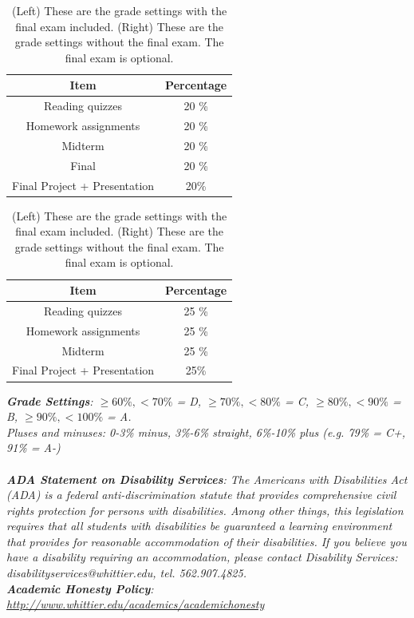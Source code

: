\documentclass[10pt]{article}
\begin{document}
\begin{table}[h]
\centering
\begin{tabular}{| c | c |}
\hline
Item & Percentage \\ \hline \hline
Reading quizzes & 20 \% \\ \hline
Homework assignments & 20 \% \\ \hline
Midterm & 20 \% \\ \hline
Final & 20 \% \\ \hline
Final Project + Presentation & 20\% \\ \hline
\end{tabular}
\begin{tabular}{| c | c |}
\hline
Item & Percentage \\ \hline \hline
Reading quizzes & 25 \% \\ \hline
Homework assignments & 25 \% \\ \hline
Midterm & 25 \% \\ \hline
Final Project + Presentation & 25\% \\ \hline
\end{tabular}
\caption{\label{tab:grades} (Left) These are the grade settings with the final exam included. (Right) These are the grade settings without the final exam.  The final exam is optional.}
\end{table}
\vspace{0.5cm}
\textit{\textbf{Grade Settings}: $\geq 60\%, <70\%$ = D, $\geq 70\%, <80\%$ = C, $\geq 80\%, <90\%$ = B, $\geq 90\%, <100\%$ = A.  \\ Pluses and minuses: 0-3\% minus, 3\%-6\% straight, 6\%-10\% plus (e.g. 79\% = C+, 91\% = A-)} \\ \\
\textit{\textbf{ADA Statement on Disability Services}: The Americans with Disabilities Act (ADA) is a federal anti-discrimination statute that provides comprehensive civil rights protection for persons with disabilities. Among other things, this legislation requires that all students with disabilities be guaranteed a learning environment that provides for reasonable accommodation of their disabilities. If you believe you have a disability requiring an accommodation, please contact Disability Services: disabilityservices@whittier.edu, tel. 562.907.4825.} \\
\textit{\textbf{Academic Honesty Policy}: \url{http://www.whittier.edu/academics/academichonesty}}
\end{document}
